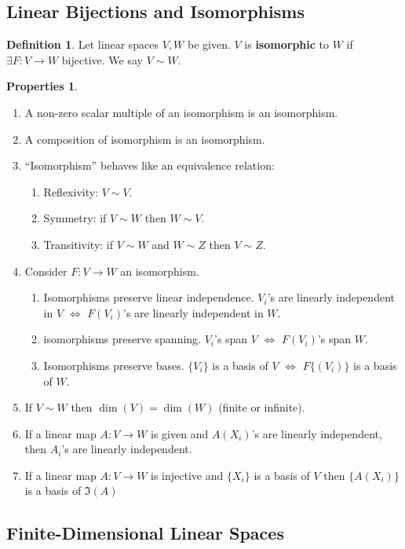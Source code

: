 \documentclass{article}
\theoremstyle{definition}
\newtheorem{defn}{Definition}[section]
\newtheorem{prop}{Properties}[section]
\begin{document}
\subsection{Linear Bijections and Isomorphisms}
\begin{defn}
	Let linear spaces $V, W$ be given. $V$ is \textbf{isomorphic} to $W$ if $\exists F : V \rightarrow W$ bijective. We say $V \sim W$. 
\end{defn}
\begin{prop}
	$\,$
	\begin{enumerate}
		\item A non-zero scalar multiple of an isomorphism is an isomorphism.
		\item A composition of isomorphism is an isomorphism.
		\item ``Isomorphism'' behaves like an equivalence relation:
		\begin{enumerate}
			\item Reflexivity: $V \sim V$.
			\item Symmetry: if $V\sim W$ then $W\sim V$.
			\item Transitivity: if $V\sim W$ and $W \sim Z$ then $V\sim Z$.
		\end{enumerate}
		\item Consider $F : V \rightarrow W$ an isomorphism.
			\begin{enumerate}
				\item Isomorphisms preserve linear independence. $V_i$'s are linearly independent in $V$ $\iff$ $F(V_i)$'s are linearly independent in $W$.
				\item isomorphisms preserve spanning. $V_i$'s span $V$ $\iff$ $F(V_i)$'s span $W$.
				\item Isomorphisms preserve bases. $\{V_i\}$ is a basis of $V$ $\iff$ $F\{(V_i)\}$ is a basis of $W$.
			\end{enumerate}
		\item If $V\sim W$ then $\dim(V) = \dim(W)$ (finite or infinite).
		\item If a linear map $A : V \rightarrow W$ is given and $A(X_i)$'s are linearly independent, then $A_i$'s are linearly independent.  
		\item If a linear map $A : V \rightarrow W$ is injective and $\{ X_i\}$ is a basis of $V$ then $\{ A(X_i)\}$ is a basis of $\Im(A)$
	\end{enumerate}
\end{prop}
\subsection{Finite-Dimensional Linear Spaces}
\end{document}
